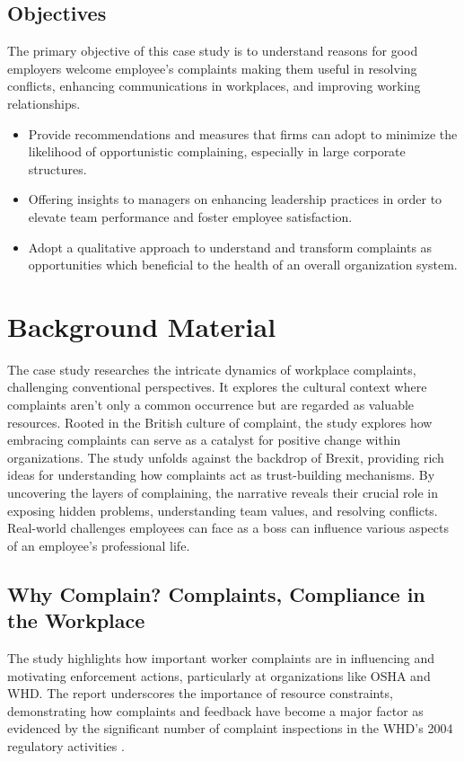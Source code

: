 \documentclass[a4paper,12pt]{article}
\begin{document}
\subsection{Objectives}
The primary objective of this case study is to understand reasons for good employers welcome employee’s complaints making them useful in resolving conflicts, enhancing communications in workplaces, and improving working relationships.
\begin{itemize}
    \item Provide recommendations and measures that firms can adopt to minimize the likelihood of opportunistic complaining, especially in large corporate structures\cite{opportunistic_complain}. 
    \item Offering insights to managers on enhancing leadership practices in order to elevate team performance and foster employee satisfaction.
    \item Adopt a qualitative approach to understand and transform complaints as opportunities which beneficial to the health of an overall organization system\cite{complaint_to_opportunities}.
\end{itemize}


\newpage
\section{Background Material}
The case study researches the intricate dynamics of workplace complaints, challenging conventional perspectives. It explores the cultural context where complaints aren't only a common occurrence but are regarded as valuable resources.  Rooted in the British culture of complaint, the study explores how embracing complaints can serve as a catalyst for positive change within organizations. The study unfolds against the backdrop of Brexit, providing rich ideas for understanding how complaints act as trust-building mechanisms. By uncovering the layers of complaining,  the narrative reveals their crucial role in exposing hidden problems, understanding team values, and resolving conflicts.  Real-world challenges employees can face as a boss can influence various aspects of an employee's professional life\cite{complain_boss}.

\subsection{Why Complain? Complaints, Compliance in the Workplace}
The study highlights how important worker complaints are in influencing and motivating enforcement actions, particularly at organizations like OSHA and WHD. The report underscores the importance of resource constraints, demonstrating how complaints and feedback have become a major factor as evidenced by the significant number of complaint inspections in the WHD's 2004 regulatory activities \cite{why_complaints}. 
\end{document}
